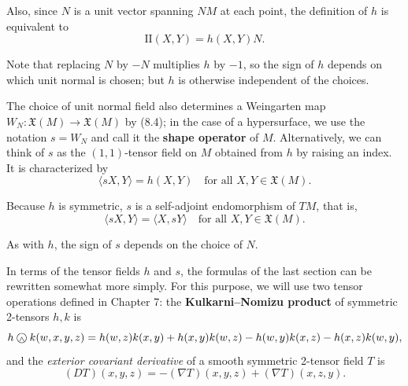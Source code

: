 Also, since $N$ is a unit vector spanning $NM$ at each point, the definition of $h$ is equivalent to
\begin{equation}
\text{II}(X,Y) = h(X,Y)N.
\tag{8.10}
\end{equation}

Note that replacing $N$ by $-N$ multiplies $h$ by $-1$, so the sign of $h$ depends on which unit normal is chosen; but $h$ is otherwise independent of the choices.

The choice of unit normal field also determines a Weingarten map $W_N : \mathfrak{X}(M) \to \mathfrak{X}(M)$ by (8.4); in the case of a hypersurface, we use the notation $s = W_N$ and call it the \textbf{shape operator} of $M$. Alternatively, we can think of $s$ as the $(1,1)$-tensor field on $M$ obtained from $h$ by raising an index. It is characterized by
\[
\langle sX, Y \rangle = h(X,Y) \quad \text{for all } X,Y \in \mathfrak{X}(M).
\]

Because $h$ is symmetric, $s$ is a self-adjoint endomorphism of $TM$, that is,
\[
\langle sX, Y \rangle = \langle X, sY \rangle \quad \text{for all } X,Y \in \mathfrak{X}(M).
\]

As with $h$, the sign of $s$ depends on the choice of $N$.

In terms of the tensor fields $h$ and $s$, the formulas of the last section can be rewritten somewhat more simply. For this purpose, we will use two tensor operations defined in Chapter 7: the \textbf{Kulkarni--Nomizu product} of symmetric 2-tensors $h,k$ is
\[
h \owedge k(w, x, y, z) = h(w, z)k(x, y) + h(x, y)k(w, z) - h(w, y)k(x, z) - h(x, z)k(w, y),
\]
and the \emph{exterior covariant derivative} of a smooth symmetric 2-tensor field $T$ is
\[
(DT)(x, y, z) = -(\nabla T)(x, y, z) + (\nabla T)(x, z, y).
\]

